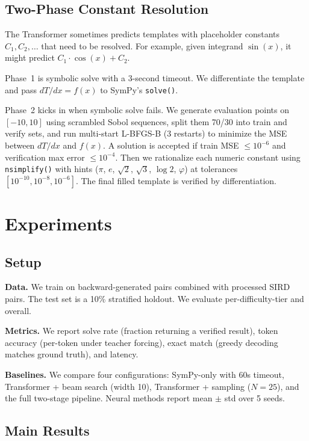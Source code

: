 \documentclass[conference]{IEEEtran}
\begin{document}
\subsection{Two-Phase Constant Resolution}

The Transformer sometimes predicts templates with placeholder constants $C_1, C_2, \ldots$ that need to be resolved. For example, given integrand $\sin(x)$, it might predict $C_1 \cdot \cos(x) + C_2$.

Phase~1 is symbolic solve with a 3-second timeout. We differentiate the template and pass $dT/dx = f(x)$ to SymPy's \texttt{solve()}.

Phase~2 kicks in when symbolic solve fails. We generate evaluation points on $[-10, 10]$ using scrambled Sobol sequences, split them 70/30 into train and verify sets, and run multi-start L-BFGS-B (3 restarts) to minimize the MSE between $dT/dx$ and $f(x)$. A solution is accepted if train MSE $\leq 10^{-6}$ and verification max error $\leq 10^{-4}$. Then we rationalize each numeric constant using \texttt{nsimplify()} with hints ($\pi$, $e$, $\sqrt{2}$, $\sqrt{3}$, $\log 2$, $\varphi$) at tolerances $[10^{-10}, 10^{-8}, 10^{-6}]$. The final filled template is verified by differentiation.

\section{Experiments}

\subsection{Setup}

\textbf{Data.} We train on backward-generated pairs combined with processed SIRD pairs. The test set is a 10\% stratified holdout. We evaluate per-difficulty-tier and overall.

\textbf{Metrics.} We report solve rate (fraction returning a verified result), token accuracy (per-token under teacher forcing), exact match (greedy decoding matches ground truth), and latency.

\textbf{Baselines.} We compare four configurations: SymPy-only with 60s timeout, Transformer + beam search (width 10), Transformer + sampling ($N = 25$), and the full two-stage pipeline. Neural methods report mean $\pm$ std over 5 seeds.

\subsection{Main Results}
\end{document}

